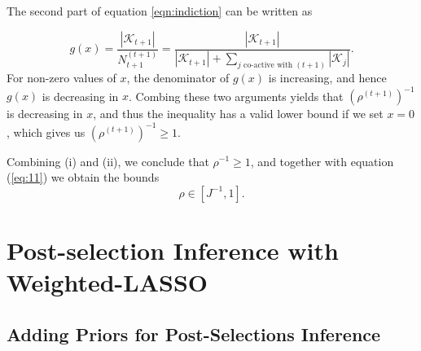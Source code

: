 \documentclass[11pt]{article}
\begin{document}
\begin{enumerate}
		The second part of equation \ref{eqn:indiction} can be written as
		
		\begin{equation}
			g(x)=\frac{|\mathcal{K}_{t+1}|}{N_{t+1}^{(t+1)}}
			=\frac{|\mathcal{K}_{t+1}|}{|\mathcal{K}_{t+1}|+\sum_{j\textrm{ co-active with }(t+1)}|\mathcal{K}_{j}|}.
		\end{equation}
		For non-zero values of $x$, the denominator of $g(x)$ is increasing, and hence $g(x)$ is decreasing in $x$.
		Combing these two arguments yields that $(\rho^{(t+1)})^{-1}$ is decreasing in $x$, and thus the inequality has a valid lower bound if we set $x=0$, which gives us $    (\rho^{(t+1)})^{-1}\geq 1$.
	\end{enumerate}
	
	Combining (i) and (ii), we conclude that $\rho^{-1}\geq 1$, and together with equation (\ref{eq:11}) we obtain the bounds
	\begin{equation}
		\rho\in[J^{-1},1].
	\end{equation}
	
	
	\section{Post-selection Inference with Weighted-LASSO}
	
	
	
	
	\subsection{Adding Priors for Post-Selections Inference}\label{sec2}
	
\end{document}
